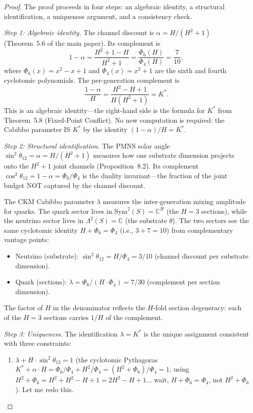 \documentclass[11pt,a4paper]{article}
\theoremstyle{definition}
\theoremstyle{remark}
\newcommand{\C}{\mathbb{C}}
\newcommand{\Sym}{\mathrm{Sym}}
\begin{document}
\begin{proof}
The proof proceeds in four steps: an algebraic identity, a structural identification, a uniqueness argument, and a consistency check.

\emph{Step 1: Algebraic identity.}
The channel discount is $\alpha = H/(H^2+1)$ (Theorem~5.6 of the main paper). Its complement is
\begin{equation}\label{eq:complement}
1-\alpha = \frac{H^2+1-H}{H^2+1} = \frac{\Phi_6(H)}{\Phi_4(H)} = \frac{7}{10},
\end{equation}
where $\Phi_6(x)=x^2-x+1$ and $\Phi_4(x)=x^2+1$ are the sixth and fourth cyclotomic polynomials. The per-generation complement is
\begin{equation}\label{eq:per_gen}
\frac{1-\alpha}{H} = \frac{H^2-H+1}{H(H^2+1)} = K^*.
\end{equation}
This is an algebraic identity---the right-hand side is the formula for $K^*$ from Theorem~5.8 (Fixed-Point Conflict). No new computation is required: the Cabibbo parameter IS $K^*$ by the identity $(1-\alpha)/H = K^*$.

\emph{Step 2: Structural identification.}
The PMNS solar angle $\sin^2\theta_{12} = \alpha = H/(H^2+1)$ measures how one substrate dimension projects onto the $H^2+1$ joint channels (Proposition~8.2). Its complement $\cos^2\theta_{12} = 1-\alpha = \Phi_6/\Phi_4$ is the duality invariant---the fraction of the joint budget NOT captured by the channel discount.

The CKM Cabibbo parameter $\lambda$ measures the inter-generation mixing amplitude for quarks. The quark sector lives in $\Sym^2(S) = \C^H$ (the $H=3$ sections), while the neutrino sector lives in $\Lambda^2(S) = \C$ (the substrate $\theta$). The two sectors see the same cyclotomic identity $H + \Phi_6 = \Phi_4$ (i.e., $3+7=10$) from complementary vantage points:
\begin{itemize}[nosep]
\item Neutrino (substrate): $\sin^2\theta_{12} = H/\Phi_4 = 3/10$ (channel discount per substrate dimension).
\item Quark (sections): $\lambda = \Phi_6/(H\cdot\Phi_4) = 7/30$ (complement per section dimension).
\end{itemize}
The factor of $H$ in the denominator reflects the $H$-fold section degeneracy: each of the $H=3$ sections carries $1/H$ of the complement.

\emph{Step 3: Uniqueness.}
The identification $\lambda = K^*$ is the unique assignment consistent with three constraints:
\begin{enumerate}[nosep]
\item $\lambda + H\cdot\sin^2\theta_{12} = 1$ (the cyclotomic Pythagoras $K^* + \alpha\cdot H = \Phi_6/\Phi_4 + H^2/\Phi_4 = (H^2+\Phi_6)/\Phi_4 = 1$, using $H^2 + \Phi_6 = H^2 + H^2 - H + 1 = 2H^2-H+1$... wait, $H + \Phi_6 = \Phi_4$, not $H^2 + \Phi_6$). Let me redo this.


\end{enumerate}
\end{proof}
\end{document}
